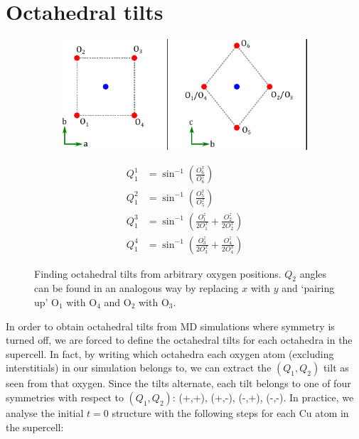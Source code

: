 \section{Octahedral tilts}\label{sec:md_tilts}
\begin{figure}
	\centering
	\begin{subfigure}{0.64\textwidth}
		\includegraphics[width=\textwidth]{fig/md/q1q2_md_tilts.pdf}
	\end{subfigure}
	\begin{subfigure}{0.35\textwidth}
		\begin{align*}
			Q_1^1 &= \sin ^{-1} \left( \frac{O_6^x}{O_6^z} \right) \\
			Q_1^2 &= \sin ^{-1} \left( \frac{O_5^x}{O_5^z} \right) \\
			Q_1^3 &= \sin ^{-1} \left( \frac{O_1^z}{2 O_1^x} + \frac{O_2^z}{2 O_2^x} \right) \\
			Q_1^4 &= \sin ^{-1} \left( \frac{O_3^z}{2 O_3^x} + \frac{O_4^z}{2 O_4^x} \right)
		\end{align*}
	\end{subfigure}	
	\caption[Finding octahedral tilts from arbitrary oxygen positions]{Finding octahedral tilts from arbitrary oxygen positions. $Q_2$ angles can be found in an analogous way by replacing $x$ with $y$ and `pairing up' O$_1$ with O$_4$ and O$_2$ with O$_3$.}
	\label{fig:md_octahedral_tilts}
\end{figure}

In order to obtain octahedral tilts from MD simulations where symmetry is turned off, we are forced to define the octahedral tilts for each octahedra in the supercell. In fact, by writing which octahedra each oxygen atom (excluding interstitials) in our simulation belongs to, we can extract the $(Q_1,Q_2)$ tilt as seen from that oxygen. Since the tilts alternate, each tilt belongs to one of four symmetries with respect to $(Q_1,Q_2)$: (+,+), (+,-), (-,+), (-,-). In practice, we analyse the initial $t=0$ structure with the following steps for each Cu atom in the supercell:

